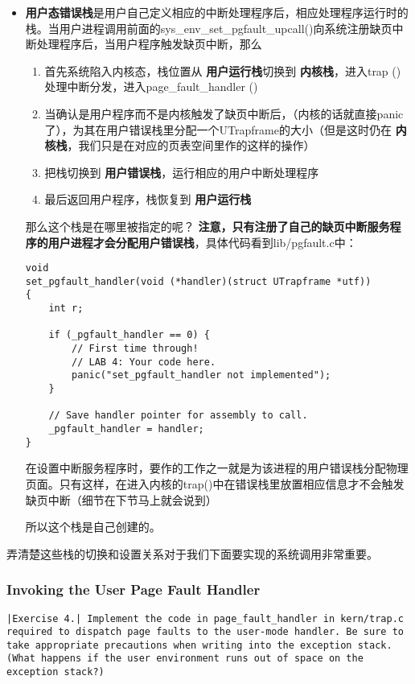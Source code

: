 \documentclass{article}
\newcommand{\highlight}[1]{{\bfseries \color{red}  #1}}
\newcommand{\funcname}[1]{{\ttfamily \small #1}}
\begin{document}
\begin{CJK*}{UTF8}{gkai}
\begin{itemize}
\item{\highlight{用户态错误栈}是用户自己定义相应的中断处理程序后，相应处理程序运行时的栈。当用户进程调用前面的\funcname{sys\_env\_set\_pgfault\_upcall()}向系统注册缺页中断处理程序后，当用户程序触发缺页中断，那么
\begin{enumerate}
\item{首先系统陷入内核态，栈位置从\highlight{用户运行栈}切换到\highlight{内核栈}，进入trap ()处理中断分发，进入page\_fault\_handler ()}
\item{当确认是用户程序而不是内核触发了缺页中断后，（内核的话就直接panic了），为其在用户错误栈里分配一个UTrapframe的大小（但是这时仍在\highlight{内核栈}，我们只是在对应的页表空间里作的这样的操作）}
\item{把栈切换到\highlight{用户错误栈}，运行相应的用户中断处理程序}
\item{最后返回用户程序，栈恢复到\highlight{用户运行栈}}
\end{enumerate}

那么这个栈是在哪里被指定的呢？\highlight{注意，只有注册了自己的缺页中断服务程序的用户进程才会分配用户错误栈}，具体代码看到lib/pgfault.c中：

\begin{lstlisting}[style=ccode, title={\scriptsize \ttfamily \bfseries lib/pgfault.c: set\_pgfault\_handler()}]
void
set_pgfault_handler(void (*handler)(struct UTrapframe *utf))
{
	int r;

	if (_pgfault_handler == 0) {
		// First time through!
		// LAB 4: Your code here.
		panic("set_pgfault_handler not implemented");
	}

	// Save handler pointer for assembly to call.
	_pgfault_handler = handler;
}
\end{lstlisting}

在设置中断服务程序时，要作的工作之一就是为该进程的用户错误栈分配物理页面。只有这样，在进入内核的trap()中在错误栈里放置相应信息才不会触发缺页中断（细节在下节马上就会说到）

所以这个栈是自己创建的。
}
\end{itemize}

弄清楚这些栈的切换和设置关系对于我们下面要实现的系统调用非常重要。




\subsubsection{Invoking the User Page Fault Handler}


\begin{lstlisting}[style=exercise]
|Exercise 4.| Implement the code in page_fault_handler in kern/trap.c required to dispatch page faults to the user-mode handler. Be sure to take appropriate precautions when writing into the exception stack. (What happens if the user environment runs out of space on the exception stack?)
\end{lstlisting}


\end{CJK*}
\end{document}
